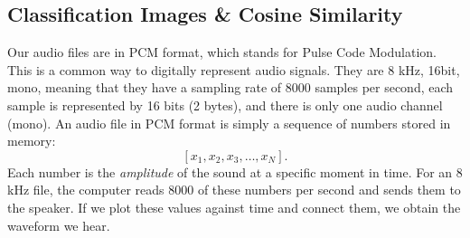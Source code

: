 \documentclass[11pt]{article}
\begin{document}
\subsection{Classification Images & Cosine Similarity}
Our audio files are in PCM format, which stands for Pulse Code Modulation. This is a common way to digitally represent audio signals.
They are 8 kHz, 16bit, mono, meaning that they have a sampling rate of 8000 samples per second, each sample is represented by 16 bits (2 bytes), and there is only one audio channel (mono).
An audio file in PCM format is simply a sequence of numbers stored in memory:
\[
[x_1, x_2, x_3, \dots, x_N].
\]
Each number is the \emph{amplitude} of the sound at a specific moment in time. 
For an 8 kHz file, the computer reads 8000 of these numbers per second and sends them to the speaker. 
If we plot these values against time and connect them, we obtain the waveform we hear.

\vspace{0.5em}
\begin{center}
\end{center}
\vspace{0.5em}
\end{document}
